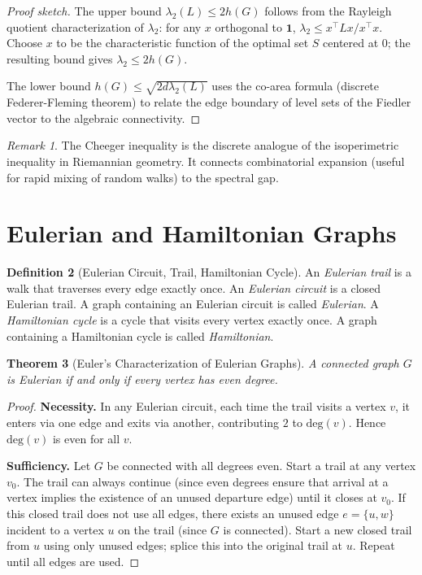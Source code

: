 \documentclass[12pt,a4paper]{amsart}
\newtheorem{theorem}{Theorem}[section]
\theoremstyle{definition}
\newtheorem{definition}[theorem]{Definition}
\theoremstyle{remark}
\newtheorem{remark}[theorem]{Remark}
\newcommand{\degv}{\mathrm{deg}}
\begin{document}
\begin{proof}[Proof sketch]
The upper bound $\lambda_2(L) \le 2h(G)$ follows from the Rayleigh quotient
characterization of $\lambda_2$: for any $x$ orthogonal to $\mathbf{1}$,
$\lambda_2 \le x^\top L x / x^\top x$. Choose $x$ to be the characteristic
function of the optimal set $S$ centered at $0$; the resulting bound gives
$\lambda_2 \le 2h(G)$.

The lower bound $h(G) \le \sqrt{2d \lambda_2(L)}$ uses the co-area formula
(discrete Federer-Fleming theorem) to relate the edge boundary of level sets
of the Fiedler vector to the algebraic connectivity.
\end{proof}

\begin{remark}
The Cheeger inequality is the discrete analogue of the isoperimetric inequality
in Riemannian geometry. It connects combinatorial expansion (useful for rapid
mixing of random walks) to the spectral gap.
\end{remark}

\section{Eulerian and Hamiltonian Graphs}
\label{sec:euler_hamilton}

\begin{definition}[Eulerian Circuit, Trail, Hamiltonian Cycle]
An \emph{Eulerian trail} is a walk that traverses every edge exactly once.
An \emph{Eulerian circuit} is a closed Eulerian trail. A graph containing an
Eulerian circuit is called \emph{Eulerian}. A \emph{Hamiltonian cycle} is a
cycle that visits every vertex exactly once. A graph containing a Hamiltonian
cycle is called \emph{Hamiltonian}.
\end{definition}

\begin{theorem}[Euler's Characterization of Eulerian Graphs]
\label{thm:eulerian}
A connected graph $G$ is Eulerian if and only if every vertex has even degree.
\end{theorem}

\begin{proof}
\textbf{Necessity.} In any Eulerian circuit, each time the trail visits a
vertex $v$, it enters via one edge and exits via another, contributing $2$ to
$\degv(v)$. Hence $\degv(v)$ is even for all $v$.

\textbf{Sufficiency.} Let $G$ be connected with all degrees even. Start a
trail at any vertex $v_0$. The trail can always continue (since even degrees
ensure that arrival at a vertex implies the existence of an unused departure
edge) until it closes at $v_0$. If this closed trail does not use all edges,
there exists an unused edge $e = \{u, w\}$ incident to a vertex $u$ on the
trail (since $G$ is connected). Start a new closed trail from $u$ using only
unused edges; splice this into the original trail at $u$. Repeat until all
edges are used.
\end{proof}
\end{document}
